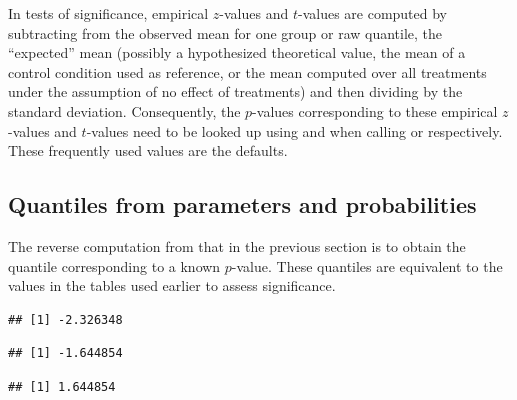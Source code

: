 \documentclass[krantz2]{krantz}\usepackage{knitr}
\begin{document}
\begin{explainbox}
  In tests of significance, empirical $z$-values and $t$-values are computed by subtracting from the observed mean for one group or raw quantile, the ``expected'' mean (possibly a hypothesized theoretical value, the mean of a control condition used as reference, or the mean computed over all treatments under the assumption of no effect of treatments) and then dividing by the standard deviation. Consequently, the $p$-values corresponding to these empirical $z$-values and $t$-values need to be looked up using  and  when calling  or  respectively. These frequently used values are the defaults.
\end{explainbox}

\subsection{Quantiles from parameters and probabilities}\label{sec:quant:prob}

The reverse computation from that in the previous section is to obtain the quantile corresponding to a known $p$-value. These quantiles are equivalent to the values in the tables used earlier to assess significance.

\begin{knitrout}\footnotesize
{}\color{fgcolor}\begin{kframe}
\begin{alltt}
\hlstd{(} \hlstd{=} \hlstd{,}  \hlstd{=} \hlstd{,}  \hlstd{=} \hlstd{)}
\end{alltt}
\begin{verbatim}
## [1] -2.326348
\end{verbatim}
\begin{alltt}
\hlstd{(} \hlstd{=} \hlstd{,}  \hlstd{=} \hlstd{,}  \hlstd{=} \hlstd{)}
\end{alltt}
\begin{verbatim}
## [1] -1.644854
\end{verbatim}
\begin{alltt}
\hlstd{(} \hlstd{=} \hlstd{,}  \hlstd{=} \hlstd{,}  \hlstd{=} \hlstd{,}  \hlstd{=} \hlstd{)}
\end{alltt}
\begin{verbatim}
## [1] 1.644854
\end{verbatim}
\end{kframe}
\end{knitrout}
\end{document}
